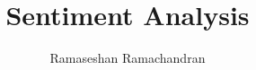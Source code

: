 


\title{ Sentiment Analysis}
\author[]{Ramaseshan Ramachandran}
\date{}
	\maketitle

    
    
    
    
    


